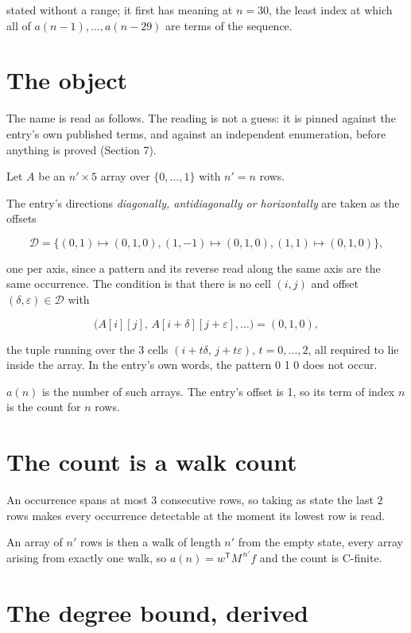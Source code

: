 \documentclass[11pt]{article}
\theoremstyle{definition}
\begin{document}
stated without a range; it first has meaning at $n = 30$, the least index at which all of $a(n-1),\dots,a(n-29)$ are terms of the sequence.

\section{The object}

The name is read as follows. The reading is not a guess: it is pinned against the entry's own published terms, and against an independent enumeration, before anything is proved (Section 7).

Let $A$ be an $n' \times 5$ array over $\{0,\dots,1\}$ with $n' = n$ rows.

The entry's directions {\itshape diagonally, antidiagonally or horizontally} are taken as the offsets

\[\mathcal{D} = \{(0,1)\mapsto(0,1,0), (1,-1)\mapsto(0,1,0), (1,1)\mapsto(0,1,0)\},\]

one per axis, since a pattern and its reverse read along the same axis are the same occurrence. The condition is that there is no cell $(i,j)$ and offset $(\delta,\varepsilon)\in\mathcal{D}$ with

\[\bigl(A[i][j],\,A[i{+}\delta][j{+}\varepsilon],\dots\bigr) = (0, 1, 0),\]

the tuple running over the $3$ cells $(i+t\delta,\,j+t\varepsilon)$, $t = 0,\dots,2$, all required to lie inside the array. In the entry's own words, the pattern 0 1 0 does not occur.

$a(n)$ is the number of such arrays. The entry's offset is 1, so its term of index $n$ is the count for $n$ rows.

\section{The count is a walk count}

An occurrence spans at most $3$ consecutive rows, so taking as state the last $2$ rows makes every occurrence detectable at the moment its lowest row is read.

An array of $n'$ rows is then a walk of length $n'$ from the empty state, every array arising from exactly one walk, so $a(n) = w^{\mathsf T}M^{\,n'}f$ and the count is C-finite.

\section{The degree bound, derived}
\end{document}
